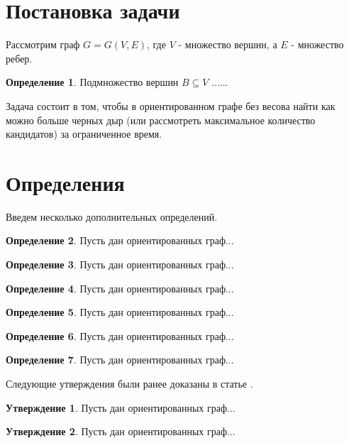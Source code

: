 \documentclass[12pt,a4paper,oneside]{article}
\theoremstyle{definition}
\newtheorem{definition}{Определение}[]
\theoremstyle{lemma}
\newtheorem{lemma}{Утверждение}[]
\theoremstyle{remark}
\begin{document}
\section{Постановка задачи}\label{sec:taskstatement}

Рассмотрим граф $G = G(V,E)$, где $V$ - множество вершин, а $E$ - множество ребер.

\begin{definition}
Подмножество вершин $B \subseteq V$ ......
\end{definition}

Задача состоит в том, чтобы в ориентированном графе без весова найти как можно больше черных дыр (или рассмотреть максимальное количество кандидатов) за ограниченное время.

\section{Определения}\label{sec:definitions}

Введем несколько дополнительных определений.

\begin{definition}
Пусть дан ориентированных граф...
\end{definition}

\begin{definition}
Пусть дан ориентированных граф...
\end{definition}

\begin{definition}
Пусть дан ориентированных граф...
\end{definition}

\begin{definition}
Пусть дан ориентированных граф...
\end{definition}

\begin{definition}
Пусть дан ориентированных граф...
\end{definition}

\begin{definition}
Пусть дан ориентированных граф...
\end{definition}

Следующие утверждения были ранее доказаны в статье \cite{li2010detecting}.

\begin{lemma}{}
Пусть дан ориентированных граф...
\end{lemma}

\begin{lemma}{}
Пусть дан ориентированных граф...
\end{lemma}
\end{document}
